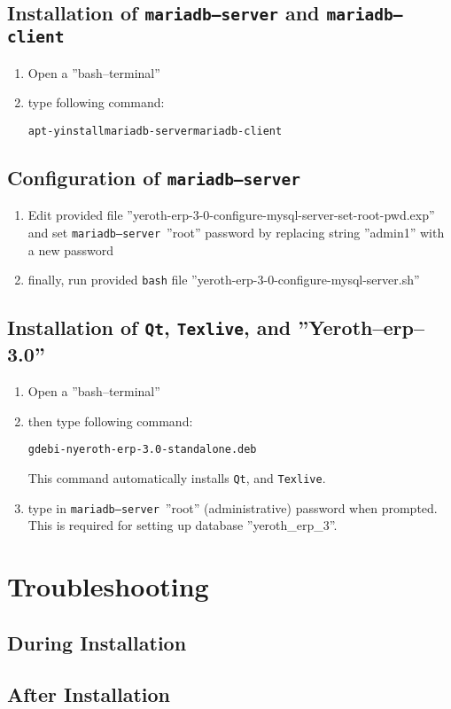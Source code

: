 \documentclass[a4paper, 10pt]{article}
\newcommand{\yerotherptroiszero}{\textbf{''Yeroth--erp--3.0''}\xspace}
\newcommand{\texlive}{\texttt{Texlive}\xspace}
\newcommand{\bash}{\texttt{bash}\xspace}
\newcommand{\qt}{\texttt{Qt}\xspace}
\newcommand{\mariadbserver}{\texttt{mariadb--server}\xspace}
\newcommand{\mariadbclient}{\texttt{mariadb--client}\xspace}
\newcommand{\rootcommand}[1]{\textcolor{purplish}{#1\xspace}}
\begin{document}
\subsection{Installation of \mariadbserver and \mariadbclient}

\begin{enumerate}[1)]
	\item Open a ''bash--terminal''
	\item type following command:
		\begin{alltt}
			\rootcommand{apt -y install mariadb-server mariadb-client}
		\end{alltt}		
\end{enumerate} 

\subsection{Configuration of \mariadbserver}

\begin{enumerate}[1)]
	\item Edit provided file ''yeroth-erp-3-0-configure-mysql-server-set-root-pwd.exp''
		and set \mariadbserver\ ''root'' password by replacing string 
		''admin1'' with a new password
	\item finally, run provided \bash file
		''yeroth-erp-3-0-configure-mysql-server.sh''	
\end{enumerate}

\subsection{Installation of \qt, \texlive, and \yerotherptroiszero}

\begin{enumerate}[1)]
	\item Open a ''bash--terminal''

	\item then type following command:
		\begin{alltt}
			\rootcommand{gdebi -n yeroth-erp-3.0-standalone.deb}
		\end{alltt}

	This command automatically installs \qt, and \texlive.
		
	\item type in \mariadbserver\ ''root'' (administrative)
		password when prompted. This is required
		for setting up  database ''yeroth\_erp\_3''.
\end{enumerate}


\section{Troubleshooting}


\subsection{During Installation}


\subsection{After Installation}
\end{document}
